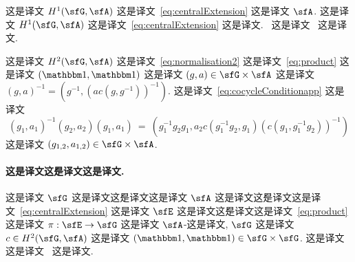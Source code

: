 \documentclass[
    affil-it, %
    auth-lg, %
    british, %
    compression, %
    contents, %
    custom-packages={}, %
    references={bigone}, %
]{lib/preprint}
\begin{document}
\begin{body}
 这是译文 $H^1(\sfG,\sfA)$ 这是译文~\eqref{eq:centralExtension} 这是译文 $\sfA$. 这是译文 $H^1(\sfG,\sfA)$ 这是译文~\eqref{eq:centralExtension} 这是译文.~\cite{Azcarraga:2011hqa} 这是译文~\cite[Section 4]{Mickelsson:1989hp} 这是译文.
        
        \begin{remark}\label{rmk:normalisation}  这是译文 $H^2(\sfG,\sfA)$ 这是译文~\eqref{eq:normalisation2} 这是译文~\eqref{eq:product} 这是译文 $(\unit,\unit)$ 这是译文 $(g,a)\in\sfG\times\sfA$ 这是译文 $(g,a)^{-1}=(g^{-1},(ac(g,g^{-1}))^{-1})$. 这是译文~\eqref{eq:cocycleConditionapp} 这是译文 
            \begin{equation}\label{eq:conjugation}
                (g_1,a_1)^{-1}(g_2,a_2)(g_1,a_1)\ =\ (g^{-1}_1g_2g_1,a_2c(g_1^{-1}g_2,g_1)(c(g_1,g_1^{-1}g_2))^{-1})
            \end{equation}  这是译文 $(g_{1,2},a_{1,2})\in\sfG\times\sfA$.
        \end{remark}
        
        \paragraph{这是译文{\'这是译文}这是译文.}
 这是译文 $\sfG$ 这是译文{\'这是译文}这是译文 $\sfA$ 这是译文{\'这是译文}这是译文~\eqref{eq:centralExtension} 这是译文 $\sfE$ 这是译文{\'这是译文}这是译文~\eqref{eq:product} 这是译文 $\pi:\sfE\rightarrow\sfG$ 这是译文 $\sfA$-这是译文, $\sfG$ 这是译文 $c\in H^2(\sfG,\sfA)$ 这是译文 $(\unit,\unit)\in\sfG\times\sfG$. 这是译文~\cite[Prop.~3.11]{Tuynman:1987ij} 这是译文~\cite{neeb2002central} 这是译文.
        

\end{body}
\end{document}
